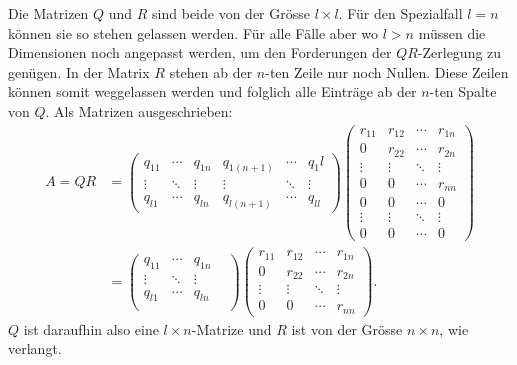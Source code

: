 Die Matrizen $Q$ und $R$ sind beide von der Grösse $l\times l$.
Für den Spezialfall $l=n$ können sie so stehen gelassen werden.
Für alle Fälle aber wo $l>n$ müssen die Dimensionen noch angepasst werden, um den Forderungen der $QR$-Zerlegung zu genügen.
In der Matrix $R$ stehen ab der $n$-ten Zeile nur noch Nullen.
Diese Zeilen können somit weggelassen werden und folglich alle Einträge ab der $n$-ten Spalte von $Q$.
Als Matrizen ausgeschrieben:
\begin{align*}
A=QR
&=
\begin{pmatrix}
q_{11}&\cdots&q_{1n}&q_{1(n+1)}&\cdots&q_1l\\
\vdots&\ddots&\vdots&\vdots    &\ddots&\vdots\\
q_{l1}&\cdots&q_{ln}&q_{l(n+1)}&\cdots&q_{ll}
\end{pmatrix}
\begin{pmatrix}
r_{11}&r_{12}&\cdots&r_{1n}\\
0     &r_{22}&\cdots&r_{2n}\\
\vdots&\vdots&\ddots&\vdots\\
0     &0     &\cdots&r_{nn}\\
0     &0     &\cdots&0\\
\vdots&\vdots&\ddots&\vdots\\
0     &0     &\cdots&0
\end{pmatrix}\\
&=
\begin{pmatrix}
q_{11}&\cdots&q_{1n}&\\
\vdots&\ddots&\vdots&\\
q_{l1}&\cdots&q_{ln}\\
\end{pmatrix}
\begin{pmatrix}
r_{11}&r_{12}&\cdots&r_{1n}\\
0     &r_{22}&\cdots&r_{2n}\\
\vdots&\vdots&\ddots&\vdots\\
0     &0     &\cdots&r_{nn}
\end{pmatrix}.
\end{align*}
$Q$ ist daraufhin also eine $l\times n$-Matrize und $R$ ist von der Grösse $n\times n$, wie verlangt.

